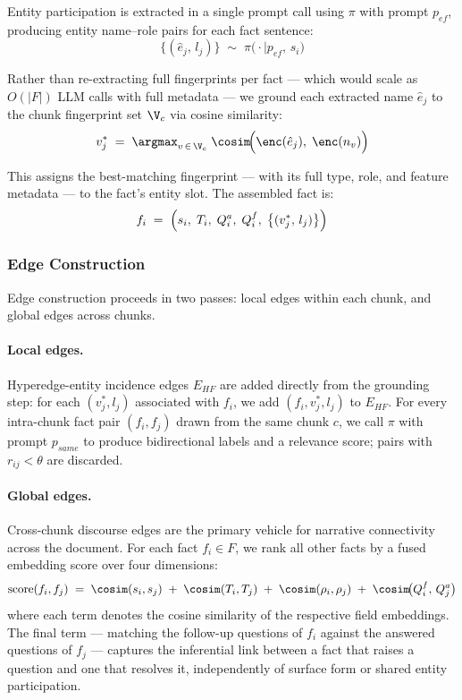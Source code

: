 \documentclass[runningheads]{llncs}
\begin{document}
Entity participation is extracted in a single prompt call using $\pi$ with
prompt $p_{ef}$, producing entity name--role pairs for each fact sentence:
\[
  \bigl\{(\hat{e}_j,\, l_j)\bigr\} \;\sim\; \pi\!\bigl(\cdot \mid p_{ef},\, s_i\bigr)
\]
 
Rather than re-extracting full fingerprints per fact --- which would scale as
$O(|F|)$ LLM calls with full metadata --- we ground each extracted name
$\hat{e}_j$ to the chunk fingerprint set $\V_c$ via cosine similarity:
\[
  v_j^* \;=\; \argmax_{v \,\in\, \V_c}\;
              \cosim\!\Bigl(\enc(\hat{e}_j),\; \enc(n_v)\Bigr)
\]
 
This assigns the best-matching fingerprint --- with its full type, role, and
feature metadata --- to the fact's entity slot. The assembled fact is:
\[
  f_i \;=\; \Bigl(s_i,\; T_i,\; Q_i^a,\; Q_i^f,\;
              \bigl\{(v_j^*,\, l_j)\bigr\}\Bigr)
\]
 
\subsubsection*{Edge Construction}
\label{sec:edge_construction}
 
Edge construction proceeds in two passes: local edges within each chunk, and
global edges across chunks.
 
\paragraph{Local edges.}
Hyperedge-entity incidence edges $E_{HF}$ are added directly from the grounding
step: for each $(v_j^*, l_j)$ associated with $f_i$, we add
$(f_i, v_j^*, l_j)$ to $E_{HF}$. For every intra-chunk fact pair $(f_i, f_j)$
drawn from the same chunk $c$, we call $\pi$ with prompt $p_{same}$ to produce
bidirectional labels and a relevance score; pairs with $r_{ij} < \theta$ are
discarded.
 
\paragraph{Global edges.}
Cross-chunk discourse edges are the primary vehicle for narrative connectivity
across the document. For each fact $f_i \in F$, we rank all other facts by a
fused embedding score over four dimensions:
\[
  \mathrm{score}(f_i, f_j) \;=\;
  \cosim(s_i, s_j) \;+\;
  \cosim(T_i, T_j) \;+\;
  \cosim(\rho_i, \rho_j) \;+\;
  \cosim\!\bigl(Q_i^f,\, Q_j^a\bigr)
\]
where each term denotes the cosine similarity of the respective field embeddings.
The final term --- matching the follow-up questions of $f_i$ against the
answered questions of $f_j$ --- captures the inferential link between a fact
that raises a question and one that resolves it, independently of surface form
or shared entity participation.
 
\end{document}
